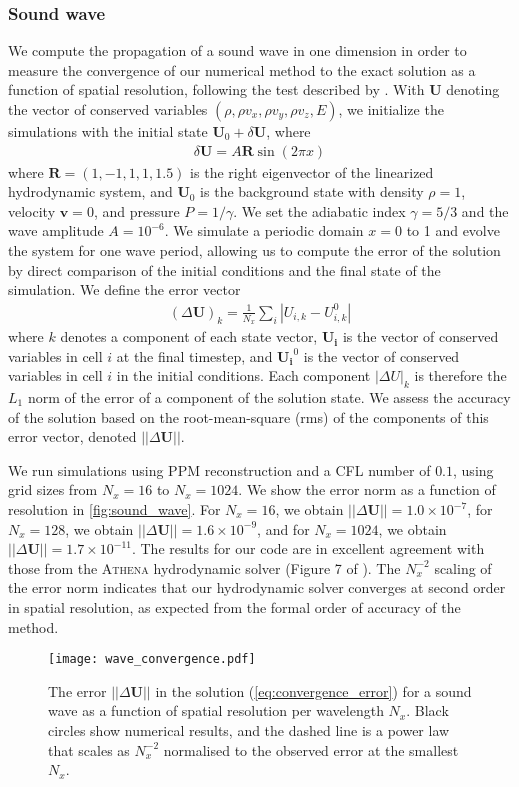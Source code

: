 \documentclass[fleqn,usenatbib]{mnras}
\newcommand{\vc}[1]{{\mathbf{#1}}}
\begin{document}
\subsubsection{Sound wave}
We compute the propagation of a sound wave in one dimension in order to measure the convergence of our numerical method to the exact solution as a function of spatial resolution, following the test described by \cite{Stone_2008}. With $\vc{U}$ denoting the vector of conserved variables $(\rho, \rho v_x, \rho v_y, \rho v_z, E)$, we initialize the simulations with the initial state $\vc{U}_0 + \delta \vc{U}$, where
\begin{align}
\delta \vc{U} = A \vc{R} \sin(2\pi x)
\end{align}
where $\vc{R} = (1,-1,1,1,1.5)$ is the right eigenvector of the linearized hydrodynamic system, and $\vc{U}_0$ is the background state with density $\rho = 1$, velocity $\vc{v} = 0$, and pressure $P = 1/\gamma$. We set the adiabatic index $\gamma = 5/3$ and the wave amplitude $A = 10^{-6}$. We simulate a periodic domain $x= 0$ to 1 and evolve the system for one wave period, allowing us to compute the error of the solution by direct comparison of the initial conditions and the final state of the simulation. We define the error vector
\begin{align}
(\Delta \vc{U})_{k} = \frac{1}{N_x} \sum_{i} \left| U_{i,k} - U_{i,k}^{0} \right|
\label{eq:convergence_error}
\end{align}
where $k$ denotes a component of each state vector, $\vc{U_i}$ is the vector of conserved variables in cell $i$ at the final timestep, and $\vc{U_i}^{0}$ is the vector of conserved variables in cell $i$ in the initial conditions. Each component $|\Delta U|_k$ is therefore the $L_1$ norm of the error of a component of the solution state.  We assess the accuracy of the solution based on the root-mean-square (rms) of the components of this error vector, denoted $||\Delta \vc{U}||$.

We run simulations using PPM reconstruction and a CFL number of $0.1$, using grid sizes from $N_x = 16$ to $N_x = 1024$. We show the error norm as a function of resolution in \autoref{fig:sound_wave}. For $N_x = 16$, we obtain $||\Delta \vc{U}|| = 1.0 \times 10^{-7}$, for $N_x = 128$, we obtain $||\Delta \vc{U}|| = 1.6 \times 10^{-9}$, and for $N_x = 1024$, we obtain $||\Delta \vc{U}|| = 1.7 \times 10^{-11}$. The results for our code are in excellent agreement with those from the \textsc{Athena} hydrodynamic solver (Figure 7 of \citealt{Stone_2008}). The $N_x^{-2}$ scaling of the error norm indicates that our hydrodynamic solver converges at second order in spatial resolution, as expected from the formal order of accuracy of the method.
\begin{figure}
    \texttt{[image: wave\_convergence.pdf]}
    \caption{The error $||\Delta \vc{U}||$ in the solution (\autoref{eq:convergence_error}) for a sound wave as a function of spatial resolution per wavelength $N_x$. Black circles show numerical results, and the dashed line is a power law that scales as $N_x^{-2}$ normalised to the observed error at the smallest $N_x$.}
    \label{fig:sound_wave}
\end{figure}
\end{document}
